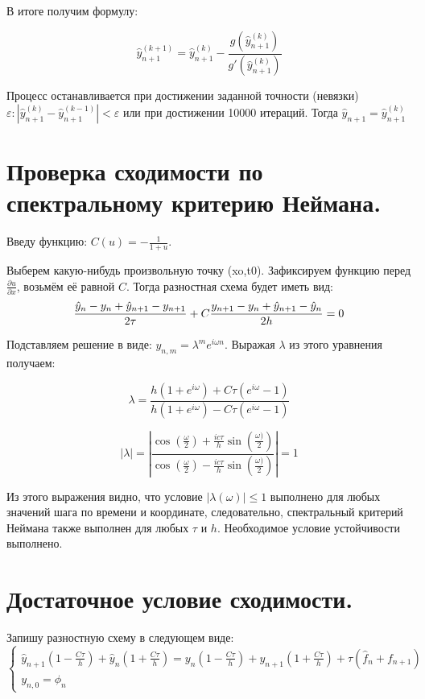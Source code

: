 \documentclass[a4paper,14pt]{article}
\begin{document}
\noindent В итоге получим формулу:

$$\hat{y}_{n+1}^{(k+1)}= \hat{y}_{n+1}^{(k)}-\frac{g(\hat{y}_{n+1}^{(k)})}{g'(\hat{y}_{n+1}^{(k)})}$$

\noindent Процесс останавливается при достижении заданной точности (невязки) $\varepsilon: |\hat{y}_{n+1}^{(k)}-\hat{y}_{n+1}^{(k-1)}|<\varepsilon$ или при достижении 10000 итераций. Тогда $\hat{y}_{n+1}=\hat{y}_{n+1}^{(k)}$

\section{Проверка сходимости по спектральному критерию Неймана.}
Введу функцию: $C(u)= -\frac{1}{1+u}$.

Выберем какую-нибудь произвольную точку (xo,t0). Зафиксируем функцию перед $\frac{\partial u}{\partial x}$, возьмём её равной $C$. Тогда разностная схема будет иметь вид:
$$\frac{\hat{y}_n-y_n+\hat{y}_{n+1}-y_{n+1}}{2 \tau} + C\frac{y_{n+1}-y_n+\hat{y}_{n+1}-\hat{y}_n}{2 h}=0\\$$

\noindent Подставляем решение в виде: $y_{n, m} = \lambda^m e^{i \omega n}$. Выражая $\lambda$ из этого уравнения получаем:

$$\lambda = \frac{h(1+e^{i \omega})+C \tau (e^{i \omega}-1)}{h(1+e^{i \omega}) - C \tau(e^{i \omega}-1)}$$

$$|\lambda| = |\frac{\cos(\frac{\omega}{2})+\frac{i c \tau}{h}\sin(\frac{\omega)}{2})}{\cos(\frac{\omega}{2})-\frac{i c \tau}{h}\sin(\frac{\omega)}{2})}|=1$$

Из этого выражения видно, что условие $|\lambda(\omega)|\leqslant 1$ выполнено для любых значений шага по времени и координате, следовательно, спектральный критерий Неймана также выполнен для любых $\tau$ и $h$. Необходимое условие устойчивости выполнено. 

\section{Достаточное условие сходимости.}
Запишу разностную схему в следующем виде: 
\begin{equation*}
\begin{cases}
   \hat{y}_{n+1}(1 - \frac{C \tau}{h})+\hat{y}_n(1 + \frac{C \tau}{h})= y_n (1 - \frac{C \tau}{h})+ y_{n+1}(1 + \frac{C \tau}{h}) + \tau (\hat{f}_{n} + f_{n+1}) \\
   y_{n,0}=\phi_n
 \end{cases}
\end{equation*}
\end{document}
